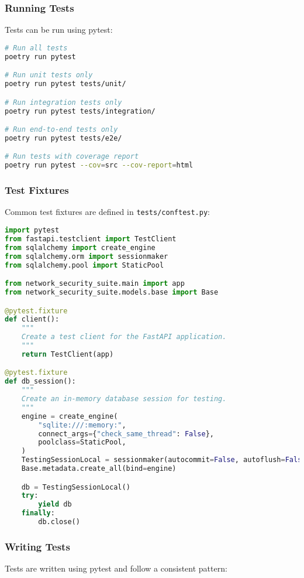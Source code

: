 \subsubsection{Running Tests}
Tests can be run using pytest:

\begin{lstlisting}[language=bash, caption=Running Tests]
# Run all tests
poetry run pytest

# Run unit tests only
poetry run pytest tests/unit/

# Run integration tests only
poetry run pytest tests/integration/

# Run end-to-end tests only
poetry run pytest tests/e2e/

# Run tests with coverage report
poetry run pytest --cov=src --cov-report=html
\end{lstlisting}

\subsubsection{Test Fixtures}
Common test fixtures are defined in \texttt{tests/conftest.py}:

\begin{lstlisting}[language=python, caption=Test Fixtures Example]
import pytest
from fastapi.testclient import TestClient
from sqlalchemy import create_engine
from sqlalchemy.orm import sessionmaker
from sqlalchemy.pool import StaticPool

from network_security_suite.main import app
from network_security_suite.models.base import Base

@pytest.fixture
def client():
    """
    Create a test client for the FastAPI application.
    """
    return TestClient(app)

@pytest.fixture
def db_session():
    """
    Create an in-memory database session for testing.
    """
    engine = create_engine(
        "sqlite:///:memory:",
        connect_args={"check_same_thread": False},
        poolclass=StaticPool,
    )
    TestingSessionLocal = sessionmaker(autocommit=False, autoflush=False, bind=engine)
    Base.metadata.create_all(bind=engine)

    db = TestingSessionLocal()
    try:
        yield db
    finally:
        db.close()
\end{lstlisting}

\subsubsection{Writing Tests}
Tests are written using pytest and follow a consistent pattern:

